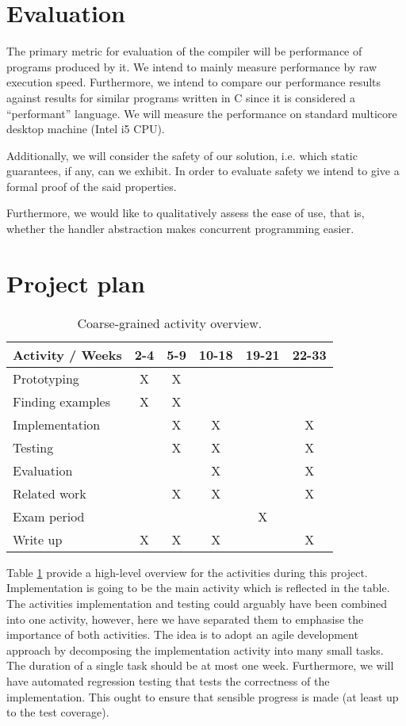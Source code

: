 \documentclass[preprint,10pt,numbers]{sigplanconf}
\begin{document}
  \section{Evaluation}
  The primary metric for evaluation of the compiler will be performance of programs produced by it. We intend to mainly measure performance by raw execution speed. Furthermore, we intend to compare our performance results against results for similar programs written in C since it is considered a ``performant'' language. We will measure the performance on standard multicore desktop machine (Intel i5 CPU).

Additionally, we will consider the safety of our solution, i.e. which static guarantees, if any, can we exhibit. In order to evaluate safety we intend to give a formal proof of the said properties.

Furthermore, we would like to qualitatively assess the ease of use, that is, whether the handler abstraction makes concurrent programming easier.

  \section{Project plan}
  \begin{table}[H]
    \centering
    \begin{tabular}{ | l | c | c | c | c | c | }
      \hline
      \multicolumn{1}{|c|}{Activity / Weeks} & 2-4 & 5-9 & 10-18 & 19-21 & 22-33 \\
      \hline
      Prototyping    & X & X & & & \\
      \hline
      Finding examples & X & X & & & \\
      \hline
      Implementation &  & X & X &  & X \\
      \hline
      Testing        &  & X & X &  & X \\
      \hline
      Evaluation     &   &   & X &  & X \\
      \hline
      Related work   &   & X & X &   & X \\
      \hline
      Exam period    &   &   &   & X &   \\
      \hline
      Write up       & X & X & X &   & X  \\
      \hline
    \end{tabular}\caption{Coarse-grained activity overview.}\label{tbl:activities}
  \end{table}
Table \ref{tbl:activities} provide a high-level overview for the activities during this project. Implementation is going to be the main activity which is reflected in the table. The activities implementation and testing could arguably have been combined into one activity, however, here we have separated them to emphasise the importance of both activities. The idea is to adopt an agile development approach by decomposing the implementation activity into many small tasks. The duration of a single task should be at most one week. Furthermore, we will have automated regression testing that tests the correctness of the implementation. This ought to ensure that sensible progress is made (at least up to the test coverage).
\end{document}

